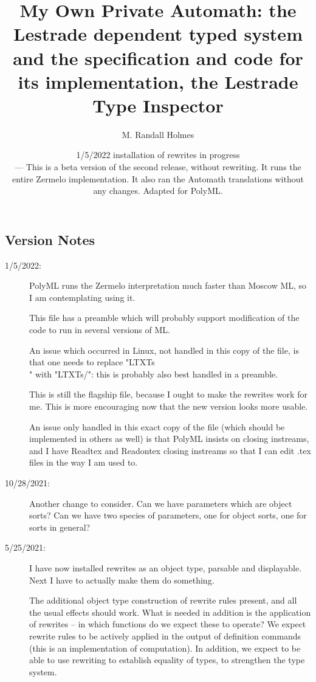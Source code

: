 \documentclass[12pt]{article}
\title{My Own Private Automath:  the Lestrade dependent typed system and the specification and code for its implementation, the Lestrade Type Inspector}
\author{M. Randall Holmes}
\date{1/5/2022  installation of rewrites in progress \\
--- This is a beta version of the second release, without rewriting.  It runs the entire  Zermelo implementation. It also ran the Automath translations without any changes.  Adapted for PolyML.}
\begin{document}
\maketitle

\tableofcontents

\newpage

\subsection{Version Notes}

\begin{description}

\item[1/5/2022:]  PolyML runs the Zermelo interpretation much faster than Moscow ML, so I am contemplating using it.

This file has a preamble which will probably support modification of the code to run in several versions of ML.

An issue which occurred in Linux, not handled in this copy of the file, is that one needs to replace "LTXTs\\" with
"LTXTs/":  this is probably also best handled in a preamble.

This is still the flagship file, because I ought to make the rewrites work for me.  This is more encouraging now that
the new version looks more usable.

An issue only handled in this exact copy of the file (which should be implemented in others as well) is that
PolyML insists on closing instreams, and I have Readtex and Readontex closing instreams so that I can edit .tex
files in the way I am used to.

\item[10/28/2021:]  Another change to consider.  Can we have parameters which are object sorts?  Can we have
two species of parameters, one for object sorts, one for sorts in general?

\item[5/25/2021:]  I have now installed rewrites as an object type, parsable and displayable.  Next I have to actually make them do something.

The additional object type construction of rewrite rules present, and all the usual effects should work.  What is needed in addition is the application of rewrites -- in which functions
do we expect these to operate?  We expect rewrite rules to be actively applied in the output of definition commands (this is an implementation of computation).
In addition, we expect to be able to use rewriting to establish equality of types, to strengthen the type system.


\end{description}
\end{document}
